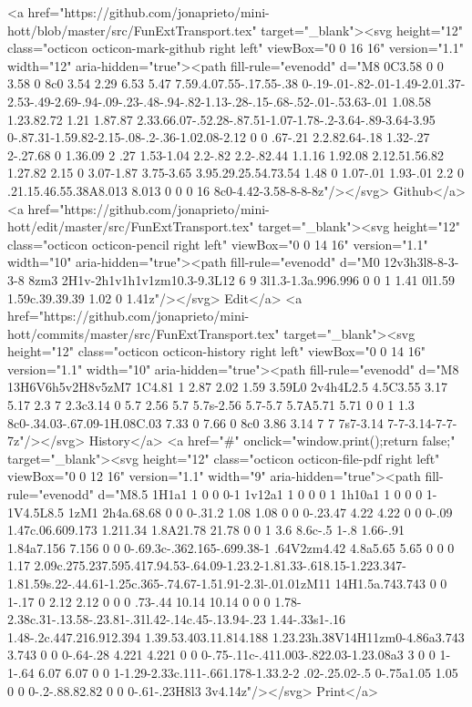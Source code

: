      <a href="https://github.com/jonaprieto/mini-hott/blob/master/src/FunExtTransport.tex" target="_blank"><svg height="12" class="octicon octicon-mark-github right left" viewBox="0 0 16 16" version="1.1" width="12" aria-hidden="true"><path fill-rule="evenodd" d="M8 0C3.58 0 0 3.58 0 8c0 3.54 2.29 6.53 5.47 7.59.4.07.55-.17.55-.38 0-.19-.01-.82-.01-1.49-2.01.37-2.53-.49-2.69-.94-.09-.23-.48-.94-.82-1.13-.28-.15-.68-.52-.01-.53.63-.01 1.08.58 1.23.82.72 1.21 1.87.87 2.33.66.07-.52.28-.87.51-1.07-1.78-.2-3.64-.89-3.64-3.95 0-.87.31-1.59.82-2.15-.08-.2-.36-1.02.08-2.12 0 0 .67-.21 2.2.82.64-.18 1.32-.27 2-.27.68 0 1.36.09 2 .27 1.53-1.04 2.2-.82 2.2-.82.44 1.1.16 1.92.08 2.12.51.56.82 1.27.82 2.15 0 3.07-1.87 3.75-3.65 3.95.29.25.54.73.54 1.48 0 1.07-.01 1.93-.01 2.2 0 .21.15.46.55.38A8.013 8.013 0 0 0 16 8c0-4.42-3.58-8-8-8z"/></svg> Github</a>
      <a href="https://github.com/jonaprieto/mini-hott/edit/master/src/FunExtTransport.tex" target="_blank"><svg height="12" class="octicon octicon-pencil right left" viewBox="0 0 14 16" version="1.1" width="10" aria-hidden="true"><path fill-rule="evenodd" d="M0 12v3h3l8-8-3-3-8 8zm3 2H1v-2h1v1h1v1zm10.3-9.3L12 6 9 3l1.3-1.3a.996.996 0 0 1 1.41 0l1.59 1.59c.39.39.39 1.02 0 1.41z"/></svg> Edit</a>
      <a href="https://github.com/jonaprieto/mini-hott/commits/master/src/FunExtTransport.tex" target="_blank"><svg height="12" class="octicon octicon-history right left" viewBox="0 0 14 16" version="1.1" width="10" aria-hidden="true"><path fill-rule="evenodd" d="M8 13H6V6h5v2H8v5zM7 1C4.81 1 2.87 2.02 1.59 3.59L0 2v4h4L2.5 4.5C3.55 3.17 5.17 2.3 7 2.3c3.14 0 5.7 2.56 5.7 5.7s-2.56 5.7-5.7 5.7A5.71 5.71 0 0 1 1.3 8c0-.34.03-.67.09-1H.08C.03 7.33 0 7.66 0 8c0 3.86 3.14 7 7 7s7-3.14 7-7-3.14-7-7-7z"/></svg> History</a>
      <a  href="#" onclick="window.print();return false;" target="_blank"><svg height="12" class="octicon octicon-file-pdf right left" viewBox="0 0 12 16" version="1.1" width="9" aria-hidden="true"><path fill-rule="evenodd" d="M8.5 1H1a1 1 0 0 0-1 1v12a1 1 0 0 0 1 1h10a1 1 0 0 0 1-1V4.5L8.5 1zM1 2h4a.68.68 0 0 0-.31.2 1.08 1.08 0 0 0-.23.47 4.22 4.22 0 0 0-.09 1.47c.06.609.173 1.211.34 1.8A21.78 21.78 0 0 1 3.6 8.6c-.5 1-.8 1.66-.91 1.84a7.156 7.156 0 0 0-.69.3c-.362.165-.699.38-1 .64V2zm4.42 4.8a5.65 5.65 0 0 0 1.17 2.09c.275.237.595.417.94.53-.64.09-1.23.2-1.81.33-.618.15-1.223.347-1.81.59s.22-.44.61-1.25c.365-.74.67-1.51.91-2.3l-.01.01zM11 14H1.5a.743.743 0 0 1-.17 0 2.12 2.12 0 0 0 .73-.44 10.14 10.14 0 0 0 1.78-2.38c.31-.13.58-.23.81-.31l.42-.14c.45-.13.94-.23 1.44-.33s1-.16 1.48-.2c.447.216.912.394 1.39.53.403.11.814.188 1.23.23h.38V14H11zm0-4.86a3.743 3.743 0 0 0-.64-.28 4.221 4.221 0 0 0-.75-.11c-.411.003-.822.03-1.23.08a3 3 0 0 1-1-.64 6.07 6.07 0 0 1-1.29-2.33c.111-.661.178-1.33.2-2 .02-.25.02-.5 0-.75a1.05 1.05 0 0 0-.2-.88.82.82 0 0 0-.61-.23H8l3 3v4.14z"/></svg> Print</a>
